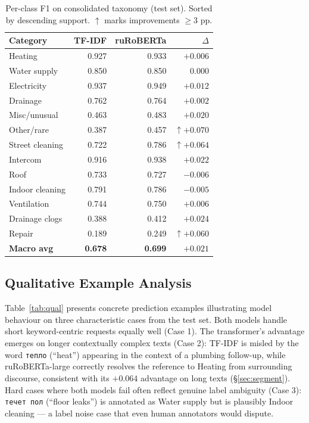 \documentclass[11pt]{article}
\begin{document}
\begin{table}[h]\centering
\small
\caption{Per-class F1 on consolidated taxonomy (test set).
Sorted by descending support. $\uparrow$ marks improvements $\geq3$ pp.}
\label{tab:perclass}
\begin{tabular}{lrrr}
\toprule
Category & TF-IDF & ruRoBERTa & $\Delta$ \\
\midrule
Heating           & 0.927 & 0.933 & $+0.006$ \\
Water supply      & 0.850 & 0.850 & $\phantom{+}0.000$ \\
Electricity       & 0.937 & 0.949 & $+0.012$ \\
Drainage          & 0.762 & 0.764 & $+0.002$ \\
Misc/unusual      & 0.463 & 0.483 & $+0.020$ \\
Other/rare        & 0.387 & 0.457 & $\uparrow{+}0.070$ \\
Street cleaning   & 0.722 & 0.786 & $\uparrow{+}0.064$ \\
Intercom          & 0.916 & 0.938 & $+0.022$ \\
Roof              & 0.733 & 0.727 & $-0.006$ \\
Indoor cleaning   & 0.791 & 0.786 & $-0.005$ \\
Ventilation       & 0.744 & 0.750 & $+0.006$ \\
Drainage clogs    & 0.388 & 0.412 & $+0.024$ \\
Repair            & 0.189 & 0.249 & $\uparrow{+}0.060$ \\
\midrule
\textbf{Macro avg}& \textbf{0.678} & \textbf{0.699} & $\mathbf{+0.021}$ \\
\bottomrule
\end{tabular}
\end{table}

\subsection{Qualitative Example Analysis}
\label{sec:qual}

Table~\ref{tab:qual} presents concrete prediction examples illustrating model
behaviour on three characteristic cases from the test set. Both models handle
short keyword-centric requests equally well (Case 1). The transformer's
advantage emerges on longer contextually complex texts (Case 2): TF-IDF is
misled by the word \texttt{тепло} (``heat'') appearing in the context of a
plumbing follow-up, while ruRoBERTa-large correctly resolves the reference
to Heating from surrounding discourse, consistent with its $+0.064$ advantage
on long texts (\S\ref{sec:segment}). Hard cases where both models fail often
reflect genuine label ambiguity (Case 3): \texttt{течет пол} (``floor leaks'')
is annotated as Water supply but is plausibly Indoor cleaning --- a label
noise case that even human annotators would dispute.
\end{document}
